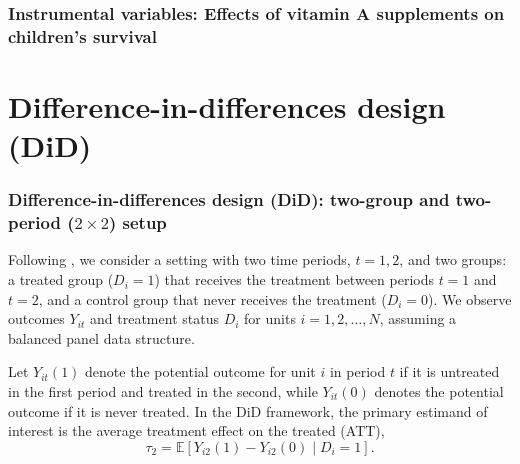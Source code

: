 \documentclass[12pt, compress]{beamer}
\begin{document}
\begin{frame}
\frametitle{Instrumental variables: Effects of vitamin A supplements on children's survival}

\begin{table}[h!]
\centering
\caption{Effects of vitamin A supplements on children's survival \citep{imbens1997bayesian}}
\label{tab:observed_data}


\end{table}
\end{frame}

\section{Difference-in-differences design (DiD)}
\begin{frame}
	\frametitle{Difference-in-differences design (DiD): two-group and two-period ($2\times2$) setup}
Following \cite{roth2023whats}, we consider a setting with two time periods, \( t = 1, 2 \), and two groups: a treated group (\( D_i = 1 \)) that receives the treatment between periods \( t = 1 \) and \( t = 2 \), and a control group that never receives the treatment (\( D_i = 0 \)). We observe outcomes \( Y_{it} \) and treatment status \( D_i \) for units \( i = 1, 2, \dots, N \), assuming a balanced panel data structure.

Let \( Y_{it}(1) \) denote the potential outcome for unit \( i \) in period \( t \) if it is untreated in the first period and treated in the second, while \( Y_{it}(0) \) denotes the potential outcome if it is never treated. In the DiD framework, the primary estimand of interest is the average treatment effect on the treated (ATT),
\[
\tau_{2} = \mathbb{E}[Y_{i2}(1) - Y_{i2}(0) \mid D_i = 1].
\]
\end{frame}
\end{document}

